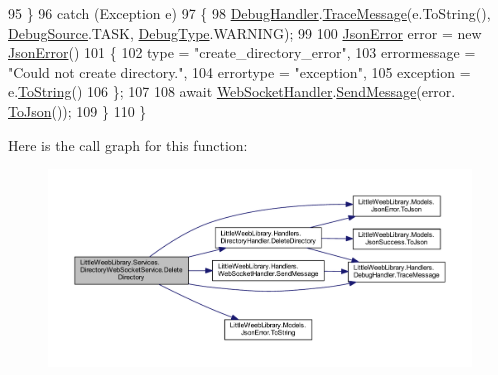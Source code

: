 \begin{DoxyCode}
95             \} 
96             \textcolor{keywordflow}{catch} (Exception e)
97             \{
98                 \mbox{\hyperlink{class_little_weeb_library_1_1_handlers_1_1_debug_handler}{DebugHandler}}.\mbox{\hyperlink{class_little_weeb_library_1_1_handlers_1_1_debug_handler_afccb37dfd6b2114af72000c2f4fe4607}{TraceMessage}}(e.ToString(), 
      \mbox{\hyperlink{namespace_little_weeb_library_1_1_handlers_a2a6ca0775121c9c503d58aa254d292be}{DebugSource}}.TASK, \mbox{\hyperlink{namespace_little_weeb_library_1_1_handlers_ab66019ed40462876ec4e61bb3ccb0a62}{DebugType}}.WARNING);
99               
100                 \mbox{\hyperlink{class_little_weeb_library_1_1_models_1_1_json_error}{JsonError}} error = \textcolor{keyword}{new} \mbox{\hyperlink{class_little_weeb_library_1_1_models_1_1_json_error}{JsonError}}()
101                 \{
102                     type = \textcolor{stringliteral}{"create\_directory\_error"},
103                     errormessage = \textcolor{stringliteral}{"Could not create directory."},
104                     errortype = \textcolor{stringliteral}{"exception"},
105                     exception = e.\mbox{\hyperlink{class_little_weeb_library_1_1_models_1_1_json_error_ad7d5522c90119111d2e929f39e7f6d3c}{ToString}}()
106                 \};
107 
108                 await \mbox{\hyperlink{class_little_weeb_library_1_1_handlers_1_1_web_socket_handler}{WebSocketHandler}}.\mbox{\hyperlink{class_little_weeb_library_1_1_handlers_1_1_web_socket_handler_a1de289d54d665a32c93478c68d3e6ad0}{SendMessage}}(error.
      \mbox{\hyperlink{class_little_weeb_library_1_1_models_1_1_json_error_a0e3e7dd2e2990404b7f0461742b23440}{ToJson}}());
109             \}
110         \}
\end{DoxyCode}
Here is the call graph for this function\+:\nopagebreak
\begin{figure}[H]
\begin{center}
\leavevmode
\includegraphics[width=350pt]{class_little_weeb_library_1_1_services_1_1_directory_web_socket_service_ac0af5740848de2340e4d3e9225eeb0d7_cgraph}
\end{center}
\end{figure}

